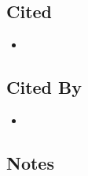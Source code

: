 \documentclass{article}
\begin{document}
\subsection*{Cited}
\begin{itemize}
\item
\end{itemize}

\subsection*{Cited By}
\begin{itemize}
\item
\end{itemize}

\subsection*{Notes}
\end{document}
